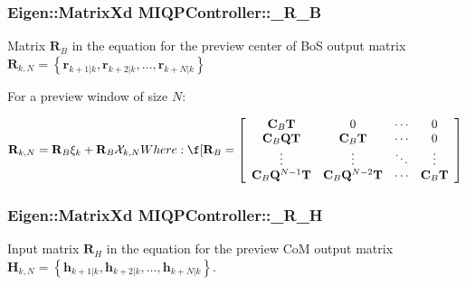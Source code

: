 \hypertarget{classMIQPController_a69fbc25a2e2f2392fe0f92c5811c12dd}{
\subsubsection[{\-\_\-\-R\-\_\-\-B}]{\setlength{\rightskip}{0pt plus 5cm}\-Eigen\-::\-Matrix\-Xd {\bf \-M\-I\-Q\-P\-Controller\-::\-\_\-\-R\-\_\-\-B}}}\label{classMIQPController_a69fbc25a2e2f2392fe0f92c5811c12dd}
\-Matrix $\mathbf{R}_B$ in the equation for the preview center of \-Bo\-S output matrix $\mathbf{R}_{k,N} = \left\{ \mathbf{r}_{k+1|k}, \mathbf{r}_{k+2|k}, \dots, \mathbf{r}_{k+N|k} \right\}$

\-For a preview window of size $N$\-:

\[ \mathbf{R}_{k,N} = \mathbf{R}_B \mathbf{\xi}_k + \mathbf{R}_B \mathcal{X}_{k,N} Where: \f[ \mathbf{R}_B = \left[\begin{array}{cccc} \mathbf{C}_B\mathbf{T} & 0 & \cdots & 0 \\ \mathbf{C}_B\mathbf{Q}\mathbf{T} & \mathbf{C}_B\mathbf{T} & \cdots & 0 \\ \vdots & \vdots & \ddots & \vdots \\ \mathbf{C}_B\mathbf{Q}^{N-1}\mathbf{T} & \mathbf{C}_B\mathbf{Q}^{N-2}\mathbf{T} & \cdots & \mathbf{C}_B\mathbf{T} \end{array}\right] \] \hypertarget{classMIQPController_a2207c17eb221166b1bc12fbca976035d}{
\subsubsection[{\-\_\-\-R\-\_\-\-H}]{\setlength{\rightskip}{0pt plus 5cm}\-Eigen\-::\-Matrix\-Xd {\bf \-M\-I\-Q\-P\-Controller\-::\-\_\-\-R\-\_\-\-H}}}\label{classMIQPController_a2207c17eb221166b1bc12fbca976035d}
\-Input matrix $\mathbf{R}_H$ in the equation for the preview \-Co\-M output matrix $\mathbf{H}_{k,N} = \left\{ \mathbf{h}_{k+1|k}, \mathbf{h}_{k+2|k}, \dots, \mathbf{h}_{k+N|k} \right\}$.


